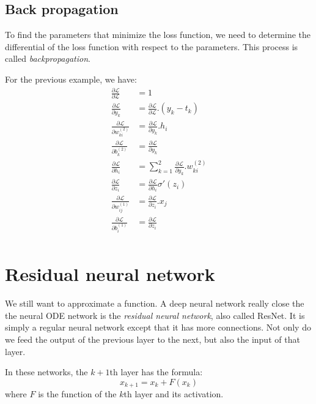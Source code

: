 \documentclass[10pt,a4paper]{article}
\theoremstyle{definition}
\theoremstyle{definition}
\theoremstyle{definition}
\begin{document}
\subsection{Back propagation}

To find the parameters that minimize the loss function, we need to determine the differential of the loss function with respect to the parameters. This process is called \textit{backpropagation}.

For the previous example, we have:
\begin{align*}
\frac{\partial \mathcal{L}}{\partial \mathcal{L}} &= 1 \\
\frac{\partial \mathcal{L}}{\partial y_k} &= \frac{\partial \mathcal{L}}{\partial \mathcal{L}} . (y_k - t_k) \\
\frac{\partial \mathcal{L}}{\partial w_{ki}^{(2)}} &= \frac{\partial \mathcal{L}}{\partial y_k} . h_i \\
\frac{\partial \mathcal{L}}{\partial b_k^{(2)}} &= \frac{\partial \mathcal{L}}{\partial y_k} \\
\frac{\partial \mathcal{L}}{\partial h_i} &= \sum_{k = 1}^2 \frac{\partial \mathcal{L}}{\partial y_k} . w_{ki}^{(2)} \\
\frac{\partial \mathcal{L}}{\partial z_i} &= \frac{\partial \mathcal{L}}{\partial h_i} \sigma '(z_i) \\
\frac{\partial \mathcal{L}}{\partial w_{ij}^{(1)}} &= \frac{\partial \mathcal{L}}{\partial z_i} . x_j \\
\frac{\partial \mathcal{L}}{\partial b_i^{(1)}} &= \frac{\partial \mathcal{L}}{\partial z_i} \\
\end{align*}


\section{Residual neural network} \label{rnn}

We still want to approximate a function. A deep neural network really close the the neural ODE network is the \textit{residual neural network}, also called ResNet. It is simply a regular neural network except that it has more connections. Not only do we feed the output of the previous layer to the next, but also the input of that layer. 

In these networks, the $k+1$th layer has the formula:
$$
x_{k+1} = x_k + F(x_k)
$$
where $F$ is the function of the $k$th layer and its activation. 
\end{document}

